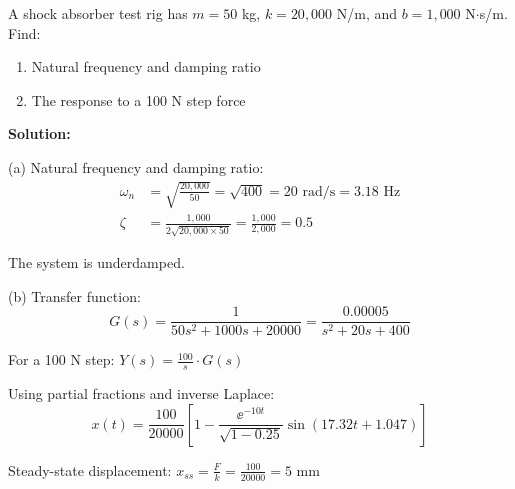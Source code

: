 \begin{examplebox}[title=Example 1.2: Automobile Shock Absorber Test]
A shock absorber test rig has $m = 50$ kg, $k = 20{,}000$ N/m, and $b = 1{,}000$ N$\cdot$s/m. Find:
\begin{enumerate}[label=(\alph*)]
    \item Natural frequency and damping ratio
    \item The response to a 100 N step force
\end{enumerate}

\textbf{Solution:}

(a) Natural frequency and damping ratio:
\begin{align}
\omega_n &= \sqrt{\frac{20{,}000}{50}} = \sqrt{400} = 20 \text{ rad/s} = 3.18 \text{ Hz} \\
\zeta &= \frac{1{,}000}{2\sqrt{20{,}000 \times 50}} = \frac{1{,}000}{2{,}000} = 0.5
\end{align}

The system is underdamped.

(b) Transfer function:
\begin{equation}
G(s) = \frac{1}{50s^2 + 1000s + 20000} = \frac{0.00005}{s^2 + 20s + 400}
\end{equation}

For a 100 N step: $Y(s) = \frac{100}{s} \cdot G(s)$

Using partial fractions and inverse Laplace:
\begin{equation}
x(t) = \frac{100}{20000}\left[1 - \frac{\ee^{-10t}}{\sqrt{1-0.25}}\sin(17.32t + 1.047)\right]
\end{equation}

Steady-state displacement: $x_{ss} = \frac{F}{k} = \frac{100}{20000} = 5$ mm
\end{examplebox}


